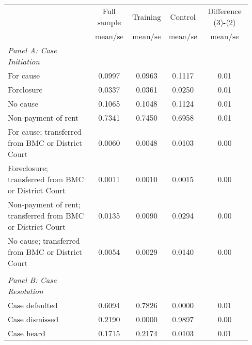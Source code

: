 {
\def\sym#1{\ifmmode^{#1}\else\(^{#1}\)\fi}
\begin{tabular}{l*{4}{c}}
\toprule
                    &\multicolumn{1}{c}{Full sample}&\multicolumn{1}{c}{Training}&\multicolumn{1}{c}{Control}&\multicolumn{1}{c}{Difference (3)-(2)}\\
                    &     mean/se&     mean/se&     mean/se&     mean/se\\
\midrule
\emph{Panel A: Case Initiation}&            &            &            &            \\
\hspace{0.25cm}For cause&     0.0997 &     0.0963 &     0.1117 &        0.01\\
\hspace{0.25cm}Forclosure&     0.0337 &     0.0361 &     0.0250 &        0.01\\
\hspace{0.25cm}No cause&     0.1065 &     0.1048 &     0.1124 &        0.01\\
\hspace{0.25cm}Non-payment of rent&     0.7341 &     0.7450 &     0.6958 &        0.01\\
\hspace{0.25cm}For cause; transferred from BMC or District Court&     0.0060 &     0.0048 &     0.0103 &        0.00\\
\hspace{0.25cm}Foreclosure; transferred from BMC or District Court&     0.0011 &     0.0010 &     0.0015 &        0.00\\
\hspace{0.25cm}Non-payment of rent; transferred from BMC or District Court&     0.0135 &     0.0090 &     0.0294 &        0.00\\
\hspace{0.25cm}No cause; transferred from BMC or District Court&     0.0054 &     0.0029 &     0.0140 &        0.00\\
\vspace{0.1em} \\ \emph{Panel B: Case Resolution}&            &            &            &            \\
\hspace{0.25cm}Case defaulted&     0.6094 &     0.7826 &     0.0000 &        0.01\\
\hspace{0.25cm}Case dismissed&     0.2190 &     0.0000 &     0.9897 &        0.00\\
\hspace{0.25cm}Case heard&     0.1715 &     0.2174 &     0.0103 &        0.01\\

\end{tabular}}
